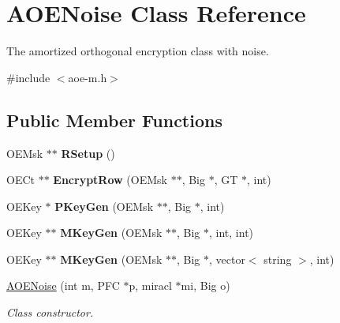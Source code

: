 \hypertarget{classAOENoise}{\section{A\-O\-E\-Noise Class Reference}
\label{classAOENoise}
}


The amortized orthogonal encryption class with noise.  




{\ttfamily \#include $<$aoe-\/m.\-h$>$}

\subsection*{Public Member Functions}
\begin{DoxyCompactItemize}
\item 
\hypertarget{classAOENoise_aace84ea252612135b75af802aabd48d0}{O\-E\-Msk $\ast$$\ast$ {\bfseries R\-Setup} ()}\label{classAOENoise_aace84ea252612135b75af802aabd48d0}

\item 
\hypertarget{classAOENoise_acbe578fc5c1ceb7228615bfb01819eb7}{O\-E\-Ct $\ast$$\ast$ {\bfseries Encrypt\-Row} (O\-E\-Msk $\ast$$\ast$, Big $\ast$, G\-T $\ast$, int)}\label{classAOENoise_acbe578fc5c1ceb7228615bfb01819eb7}

\item 
\hypertarget{classAOENoise_a17522dc5432669863eadfba8e1f297ef}{O\-E\-Key $\ast$ {\bfseries P\-Key\-Gen} (O\-E\-Msk $\ast$$\ast$, Big $\ast$, int)}\label{classAOENoise_a17522dc5432669863eadfba8e1f297ef}

\item 
\hypertarget{classAOENoise_a51c5548b81f351fe80afacacdc6716c4}{O\-E\-Key $\ast$$\ast$ {\bfseries M\-Key\-Gen} (O\-E\-Msk $\ast$$\ast$, Big $\ast$, int, int)}\label{classAOENoise_a51c5548b81f351fe80afacacdc6716c4}

\item 
\hypertarget{classAOENoise_a2e29a95c839442e2e4440becab6b7384}{O\-E\-Key $\ast$$\ast$ {\bfseries M\-Key\-Gen} (O\-E\-Msk $\ast$$\ast$, Big $\ast$, vector$<$ string $>$, int)}\label{classAOENoise_a2e29a95c839442e2e4440becab6b7384}

\item 
\hyperlink{classAOENoise_a09b41dc882e04d61e588da49d06198a9}{A\-O\-E\-Noise} (int m, P\-F\-C $\ast$p, miracl $\ast$mi, Big o)
\begin{DoxyCompactList}\small\item\em Class constructor. \end{DoxyCompactList}\end{DoxyCompactItemize}
